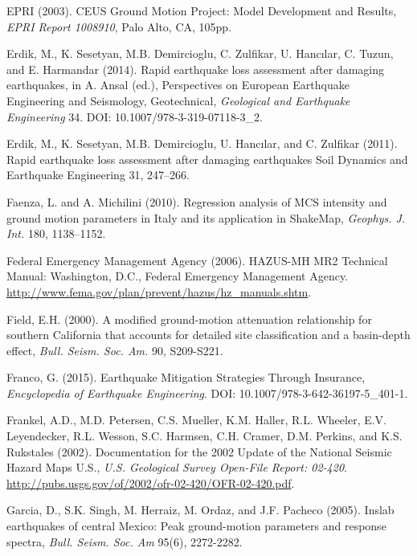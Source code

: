 \documentclass[letterpaper,10pt,english]{sphinxmanual}
\begin{document}
\label{references:epri2003}
EPRI (2003). CEUS Ground Motion Project: Model Development and Results, \emph{EPRI Report 1008910}, Palo Alto, CA, 105pp.

\label{references:erdik2014}
Erdik, M., K. Sesetyan, M.B. Demircioglu, C. Zulfikar, U. Hancılar, C. Tuzun, and E. Harmandar
(2014). Rapid earthquake loss assessment after damaging earthquakes,
in A. Ansal (ed.), Perspectives on European Earthquake Engineering and Seismology,
Geotechnical, \emph{Geological and Earthquake Engineering} 34. DOI: 10.1007/978-3-319-07118-3\_2.

\label{references:erdik2011}
Erdik, M., K. Sesetyan, M.B. Demircioglu, U. Hancılar, and C. Zulfikar
(2011). Rapid earthquake loss assessment after damaging earthquakes Soil Dynamics and Earthquake Engineering 31, 247–266.

\label{references:faenza2010}
Faenza, L. and A. Michilini (2010). Regression analysis of MCS intensity and ground motion
parameters in Italy and its application in ShakeMap, \emph{Geophys. J. Int.} 180, 1138–1152.

\label{references:fema2006}
Federal Emergency Management Agency (2006). HAZUS-MH MR2 Technical Manual: Washington, D.C.,
Federal Emergency Management Agency. \url{http://www.fema.gov/plan/prevent/hazus/hz\_manuals.shtm}.

\label{references:field2000}
Field, E.H. (2000). A modified ground-motion attenuation relationship for southern California that
accounts for detailed site classification and a basin-depth effect, \emph{Bull. Seism. Soc. Am.} 90, S209-S221.

\label{references:franco2015}
Franco, G. (2015). Earthquake Mitigation Strategies Through Insurance,
\emph{Encyclopedia of Earthquake Engineering}. DOI: 10.1007/978-3-642-36197-5\_401-1.

Frankel, A.D., M.D. Petersen, C.S. Mueller, K.M. Haller, R.L. Wheeler, E.V. Leyendecker,
R.L.  Wesson, S.C. Harmsen, C.H. Cramer, D.M. Perkins, and K.S. Rukstales (2002).
Documentation for the 2002 Update of the National Seismic Hazard Maps U.S.,
\emph{U.S. Geological Survey Open-File Report: 02-420}. \url{http://pubs.usgs.gov/of/2002/ofr-02-420/OFR-02-420.pdf}.

Garcia, D., S.K. Singh, M. Herraiz, M. Ordaz, and J.F. Pacheco (2005). Inslab earthquakes of central
Mexico: Peak ground-motion parameters and response spectra, \emph{Bull. Seism. Soc. Am} 95(6), 2272-2282.
\end{document}
